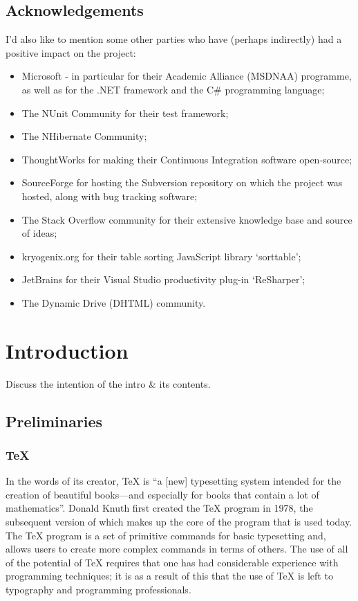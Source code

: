 \documentclass{l4proj}
\begin{document}
\section*{Acknowledgements}
I'd also like to mention some other parties who have (perhaps indirectly) had a positive impact on the project: \
\begin{itemize} 
\item Microsoft - in particular for their Academic Alliance (MSDNAA) programme, as well as for the .NET framework and the C\# programming language;
\item The NUnit Community for their test framework;
\item The NHibernate Community;
\item ThoughtWorks for making their Continuous Integration software open-source;
\item SourceForge for hosting the Subversion repository on which the project was hosted, along with bug tracking software;
\item The Stack Overflow community for their extensive knowledge base and source of ideas;
\item kryogenix.org for their table sorting JavaScript library `sorttable';
\item JetBrains for their Visual Studio productivity plug-in `ReSharper';
\item The Dynamic Drive (DHTML) community.
\end{itemize}

\educationalconsent
%
%
\tableofcontents
\chapter{Introduction}
\label{intro}
Discuss the intention of the intro \& its contents.

\section{Preliminaries}
\subsection{\TeX{}}
In the words of its creator, \TeX{} is ``a [new] typesetting system intended for the creation of beautiful books---and especially for books that contain a lot of mathematics''\cite{DK84}.  Donald Knuth first created the \TeX{} program in 1978, the subsequent version of which makes up the core of the program that is used today\cite{TeXOrigin}.  The \TeX{} program is a set of primitive commands for basic typesetting and, allows users to create more complex commands in terms of others.  The use of all of the potential of \TeX{} requires that one has had considerable experience with programming techniques; it is as a result of this that the use of \TeX{} is left to typography and programming professionals\cite{KD95}.
\end{document}
